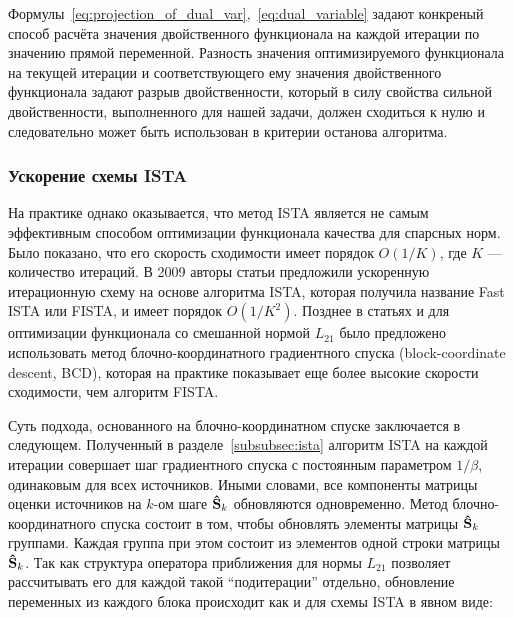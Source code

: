 Формулы~\ref{eq:projection_of_dual_var},~\ref{eq:dual_variable} задают
конкреный способ расчёта значения двойственного функционала на каждой итерации
по значению прямой переменной. Разность значения оптимизируемого функционала
на текущей итерации и соответствующего ему значения двойственного функционала
задают разрыв двойственности, который в силу свойства сильной двойственности,
выполненного для нашей задачи, должен сходиться к нулю и следовательно может быть
использован в критерии останова алгоритма.




\subsubsection{Ускорение схемы ISTA} 
\label{sec:ista_enhancements}

На практике однако оказывается, что метод
ISTA является не самым эффективным способом оптимизации функционала качества
для спарсных норм. Было показано, что его скорость сходимости имеет порядок
$O(1/K)$, где $K$ --- количество итераций. В 2009 авторы статьи
\cite{beck_trebulle_2009} предложили ускоренную итерационную схему на основе
алгоритма ISTA, которая получила название Fast ISTA или FISTA, и имеет порядок
$O(1/K^2)$. Позднее в статьях \cite{rakotomamonjy_2011} и \cite{qin_2013} для
оптимизации функционала со смешанной нормой $L_{21}$ было предложено
использовать метод блочно-координатного градиентного спуска (block-coordinate
descent, BCD), которая на практике показывает еще более высокие скорости сходимости,
чем алгоритм FISTA.

Суть подхода, основанного на блочно-координатном спуске заключается в следующем.
Полученный в разделе~\ref{subsubsec:ista} алгоритм ISTA на каждой
итерации совершает шаг градиентного спуска с постоянным параметром $1/\beta$,
одинаковым для всех источников. Иными словами, все компоненты матрицы 
оценки источников на $k$-ом шаге $\mathbf{\hat{S}}_k$ обновляются одновременно.
Метод блочно-координатного спуска состоит в том, чтобы обновлять элементы матрицы $\mathbf{\hat{S}}_k$
группами. Каждая группа при этом состоит из элементов одной строки матрицы $\mathbf{\hat{S}}_k$.
Так как структура оператора приближения для нормы $L_{21}$ позволяет
рассчитывать его для каждой такой ``подитерации'' отдельно, обновление переменных из
каждого блока происходит как и для схемы ISTA в явном виде:

